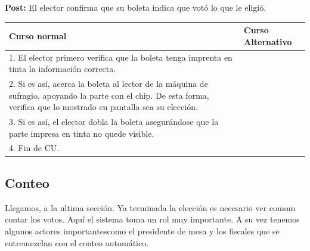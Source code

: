 \textbf{Post:} El elector confirma que su boleta indica que votó lo que le eligió.

\begin{table}[h!]
	
 \begin{tabular}{|p{7.5cm} | p{7.5cm}|} 
 \hline
 \textbf{Curso normal} & \textbf{Curso Alternativo} \\
 \hline
 1. El elector primero verifica que la boleta tenga imprenta en tinta la información correcta. & \\
\hline

2. Si es así, acerca la boleta al lector de la máquina de sufragio, apoyando la parte con el chip. De esta forma, verifica que lo mostrado en pantalla sea su elección. & \\
\hline

3. Si es así, el elector dobla la boleta asegurándose que la parte impresa en tinta no quede visible. & \\
\hline

4. Fin de CU. & \\
\hline
\end{tabular}
\end{table}

\subsection{Conteo}

Llegamos, a la ultima sección. Ya terminada la elección es necesario ver comom contar los votos. Aquí el sistema toma un rol muy importante. A su vez tenemos algunos actores importantescomo el presidente de mesa y los fiscales que se entremezclan con el conteo automático.

